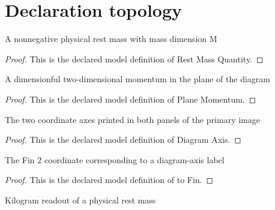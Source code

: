 \section{Declaration topology}
\begin{definition}
  \label{def:physics:phyx-mini-0554:phyxminiproblems-problemphyxmini0554-restmassquantity}
  A nonnegative physical rest mass with mass dimension M
\end{definition}
\begin{proof}
  This is the declared model definition of Rest Mass Quantity.
\end{proof}
\begin{definition}
  \label{def:physics:phyx-mini-0554:phyxminiproblems-problemphyxmini0554-planemomentum}
  A dimensionful two-dimensional momentum in the plane of the diagram
\end{definition}
\begin{proof}
  This is the declared model definition of Plane Momentum.
\end{proof}
\begin{definition}
  \label{def:physics:phyx-mini-0554:phyxminiproblems-problemphyxmini0554-diagramaxis}
  The two coordinate axes printed in both panels of the primary image
\end{definition}
\begin{proof}
  This is the declared model definition of Diagram Axis.
\end{proof}
\begin{definition}[to Fin]
  \label{def:physics:phyx-mini-0554:phyxminiproblems-problemphyxmini0554-diagramaxis-tofin}
  The Fin 2 coordinate corresponding to a diagram-axis label
\end{definition}
\begin{proof}
  This is the declared model definition of to Fin.
\end{proof}
\begin{definition}
  \label{def:physics:phyx-mini-0554:phyxminiproblems-problemphyxmini0554-restmassinkilograms}
  Kilogram readout of a physical rest mass
\end{definition}
